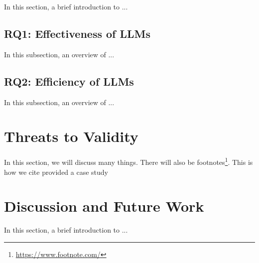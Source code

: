 In this section, a brief introduction to ... 

\vspace{0.1 cm}
\subsection{RQ1: Effectiveness of LLMs}
\label{sec:results_rq1}
\vspace{0.1 cm}

In this subsection, an overview of ...

\vspace{0.1 cm}
\subsection{RQ2: Efficiency of LLMs}
\label{sec:results_rq2}
\vspace{0.1 cm}

In this subsection, an overview of ...

\section{Threats to Validity}
\label{sec:t2v}
\vspace{0.2 cm}

In this section, we will discuss many things. There will also be footnotes\footnote{ \url{https://www.footnote.com/} }. This is how we cite\cite{Nguyen2019} provided a case study

\section{Discussion and Future Work}
\label{sec:discussion}
\vspace{0.2 cm}

In this section, a brief introduction to ... 




